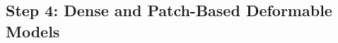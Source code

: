 

\vspace{0.3cm}
{\label{sec:step4}\subsection*{Step 4: Dense and Patch-Based Deformable Models}}





